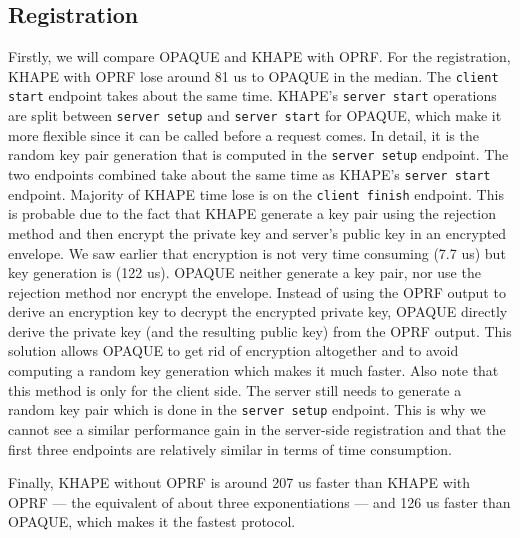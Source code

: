 ﻿\documentclass[../report.tex]{subfiles}
\begin{document}
\subsection*{Registration}
Firstly, we will compare OPAQUE and KHAPE with OPRF.
For the registration, KHAPE with OPRF lose around 81 us to OPAQUE in the median.
The \verb|client start| endpoint takes about the same time. KHAPE's \verb|server start| operations are split between \verb|server setup| and \verb|server start| for OPAQUE, which make it more flexible since it can be called before a request comes. In detail, it is the random key pair generation that is computed in the \verb|server setup| endpoint. The two endpoints combined take about the same time as KHAPE's \verb|server start| endpoint.
Majority of KHAPE time lose is on the \verb|client finish| endpoint.
This is probable due to the fact that KHAPE generate a key pair using the rejection method and then encrypt the private key and server's public key in an encrypted envelope.
We saw earlier that encryption is not very time consuming (7.7 us) but key generation is (122 us).
OPAQUE neither generate a key pair, nor use the rejection method nor encrypt the envelope.
Instead of using the OPRF output to derive an encryption key to decrypt the encrypted private key, OPAQUE directly derive the private key (and the resulting public key) from the OPRF output. This solution allows OPAQUE to get rid of encryption altogether and to avoid computing a random key generation which makes it much faster.
Also note that this method is only for the client side. The server still needs to generate a random key pair which is done in the \verb|server setup| endpoint. This is why we cannot see a similar performance gain in the server-side registration and that the first three endpoints are relatively similar in terms of time consumption.

Finally, KHAPE without OPRF is around 207 us faster than KHAPE with OPRF --- the equivalent of about three exponentiations --- and 126 us faster than OPAQUE, which makes it the fastest protocol.
\end{document}
